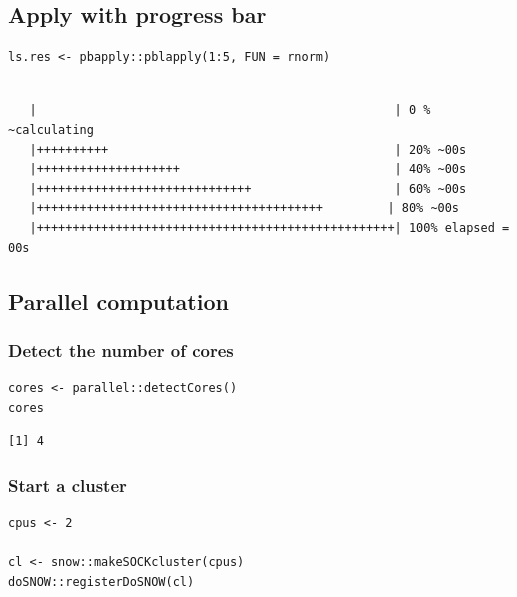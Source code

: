 \documentclass{article}
\begin{document}
\subsection{Apply with progress bar}
\label{sec:orgfeed6c1}

\lstset{language=r,label= ,caption= ,captionpos=b,numbers=none}
\begin{lstlisting}
ls.res <- pbapply::pblapply(1:5, FUN = rnorm)
\end{lstlisting}

\begin{verbatim}

   |                                                  | 0 % ~calculating  
   |++++++++++                                        | 20% ~00s          
   |++++++++++++++++++++                              | 40% ~00s          
   |++++++++++++++++++++++++++++++                    | 60% ~00s          
   |++++++++++++++++++++++++++++++++++++++++         | 80% ~00s          
   |++++++++++++++++++++++++++++++++++++++++++++++++++| 100% elapsed = 00s
\end{verbatim}

\subsection{Parallel computation}
\label{sec:orgc72bf11}
\subsubsection{Detect the number of cores}
\label{sec:org2fbd0e6}

\lstset{language=r,label= ,caption= ,captionpos=b,numbers=none}
\begin{lstlisting}
cores <- parallel::detectCores()
cores
\end{lstlisting}

\begin{verbatim}
[1] 4
\end{verbatim}

\subsubsection{Start a cluster}
\label{sec:org9c2f601}
\lstset{language=r,label= ,caption= ,captionpos=b,numbers=none}
\begin{lstlisting}
cpus <- 2

cl <- snow::makeSOCKcluster(cpus)
doSNOW::registerDoSNOW(cl)
\end{lstlisting}
\end{document}
